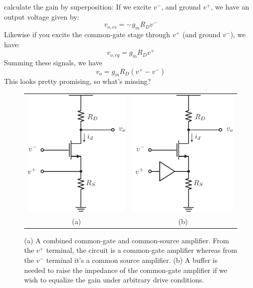 calculate the gain by superposition:  If we excite $v^-$, and ground $v^+$, we have an output voltage given by:
%
\begin{equation}
	v_{o,cs} = -g_m R_D v^-
\end{equation} 
%
Likewise if you excite the common-gate stage through $v^+$ (and ground $v^-$), we have:
\begin{equation}
	v_{o,cg} = g_m R_D  v^+
\end{equation} 
%
Summing these signals, we have
%
\begin{equation}
	v_o =   g_m R_D  (v^+ - v^- )
\end{equation}
%
This looks pretty promising, so what's missing? 
 

\begin{figure}[tb]
\begin{center}
\begin{tabular}{cc}
\includegraphics[scale=1]{amp_diff_CS_CG.pdf} &
\includegraphics[scale=1]{amp_diff_CS_CG_buffer.pdf} \\
(a) & (b) \\
\end{tabular}
\end{center}
\caption{(a) A combined common-gate and common-source amplifier.  From the $v^+$ terminal, the circuit is a common-gate amplifier whereas from the $v^-$ terminal it's a common source amplifier.  (b) A buffer is needed to raise the impedance of the common-gate amplifier if we wish to equalize the gain under arbitrary drive conditions.} \label{fig:amp_diff_CS_CG.pdf}
\end{figure}
